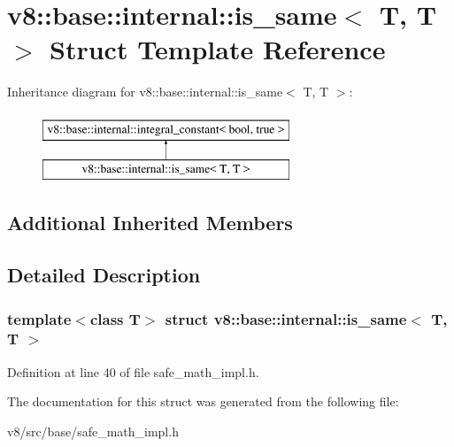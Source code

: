 \hypertarget{structv8_1_1base_1_1internal_1_1is__same_3_01T_00_01T_01_4}{}\section{v8\+:\+:base\+:\+:internal\+:\+:is\+\_\+same$<$ T, T $>$ Struct Template Reference}
\label{structv8_1_1base_1_1internal_1_1is__same_3_01T_00_01T_01_4}
Inheritance diagram for v8\+:\+:base\+:\+:internal\+:\+:is\+\_\+same$<$ T, T $>$\+:\begin{figure}[H]
\begin{center}
\leavevmode
\includegraphics[height=2.000000cm]{structv8_1_1base_1_1internal_1_1is__same_3_01T_00_01T_01_4}
\end{center}
\end{figure}
\subsection*{Additional Inherited Members}


\subsection{Detailed Description}
\subsubsection*{template$<$class T$>$\newline
struct v8\+::base\+::internal\+::is\+\_\+same$<$ T, T $>$}



Definition at line 40 of file safe\+\_\+math\+\_\+impl.\+h.



The documentation for this struct was generated from the following file\+:\begin{DoxyCompactItemize}
\item 
v8/src/base/safe\+\_\+math\+\_\+impl.\+h\end{DoxyCompactItemize}
